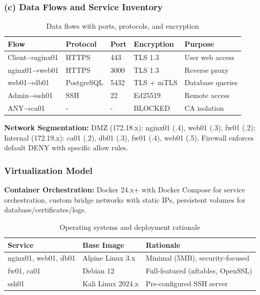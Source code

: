 \subsubsection{(c) Data Flows and Service Inventory}

\begin{table}[h]
\centering
\begin{tabular}{|l|l|l|l|p{4.5cm}|}
\hline
\textbf{Flow} & \textbf{Protocol} & \textbf{Port} & \textbf{Encryption} & \textbf{Purpose} \\
\hline
Client→nginx01 & HTTPS & 443 & TLS 1.3 & User web access \\
\hline
nginx01→web01 & HTTPS & 3000 & TLS 1.3 & Reverse proxy \\
\hline
web01→db01 & PostgreSQL & 5432 & TLS + mTLS & Database queries \\
\hline
Admin→ssh01 & SSH & 22 & Ed25519 & Remote access \\
\hline
ANY→ca01 & - & - & BLOCKED & CA isolation \\
\hline
\end{tabular}
\caption{Data flows with ports, protocols, and encryption}
\end{table}

\textbf{Network Segmentation:} DMZ (172.18.x): nginx01 (.4), web01 (.3), fw01 (.2); Internal (172.19.x): ca01 (.2), db01 (.3), fw01 (.4), web01 (.5). Firewall enforces default DENY with specific allow rules.

\subsubsection{Virtualization Model}

\textbf{Container Orchestration:} Docker 24.x+ with Docker Compose for service orchestration, custom bridge networks with static IPs, persistent volumes for database/certificates/logs.

\begin{table}[h]
\centering
\begin{tabular}{|l|l|l|}
\hline
\textbf{Service} & \textbf{Base Image} & \textbf{Rationale} \\
\hline
nginx01, web01, db01 & Alpine Linux 3.x & Minimal (5MB), security-focused \\
\hline
fw01, ca01 & Debian 12 & Full-featured (nftables, OpenSSL) \\
\hline
ssh01 & Kali Linux 2024.x & Pre-configured SSH server \\
\hline
\end{tabular}
\caption{Operating systems and deployment rationale}
\end{table}

